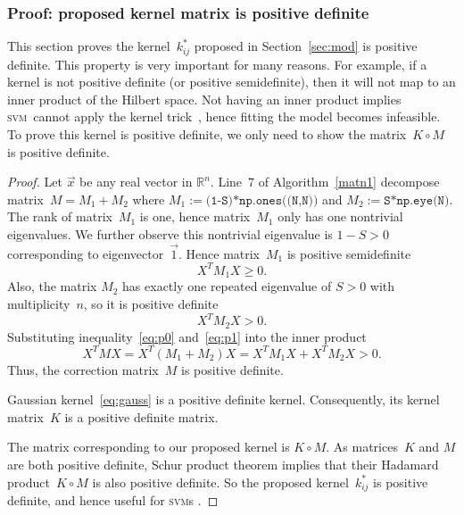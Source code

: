 \documentclass[12pt]{article} %
\newcommand{\svm}{\textsc{svm}}
\begin{document}
\subsubsection{Proof: proposed kernel matrix is positive definite} \label{sec:prove}
This section proves the kernel~$k^*_{ij}$ proposed in Section~\ref{sec:mod} is positive definite. This property is very important for many reasons. For example, if a kernel is not positive definite (or positive semidefinite), then it will not map to an inner product of the Hilbert space. Not having an inner product implies \svm\ cannot apply the kernel trick~\citep{Theodoridis:2008:PRF:1457541}, hence fitting the model becomes infeasible. To prove this kernel is positive definite, we only need to show the matrix~$K\circ M$ is positive definite.
\begin{proof}
Let $\vec x$ be any real vector in  $\mathbb{R}^n$. Line~$7$ of Algorithm~\ref{matn1} decompose matrix~$M=M_1+M_2$ where $M_1:=\texttt{(1-S)*np.ones((N,N))}$ and $M_2:=\texttt{S*np.eye(N)}$. The rank of  matrix~$M_1$ is one, hence matrix~$M_1$ only has one nontrivial eigenvalues. We further observe this nontrivial eigenvalue is $1-S>0$ corresponding to eigenvector~$\vec 1$. Hence matrix~$M_1$ is positive semidefinite
\begin{equation}\label{eq:p0}
    X^TM_1X\geq 0.
\end{equation}
Also, the matrix $M_2$ has exactly one repeated eigenvalue of $S>0$ with multiplicity~$n$, so it is positive definite
\begin{equation}\label{eq:p1}
    X^TM_2X>0.
\end{equation}
Substituting inequality~\eqref{eq:p0} and~\eqref{eq:p1} into the inner product
\begin{equation*}
    X^TMX=X^T(M_1+M_2)X=X^TM_1X+X^TM_2X>0.
\end{equation*}
Thus, the correction matrix~$M$ is positive definite.

Gaussian kernel~\eqref{eq:gauss} is a positive definite kernel. Consequently, its kernel matrix~$K$ is a positive definite matrix.

The matrix corresponding to our proposed kernel is $K\circ M$. As matrices~$K$ and $M$ are both positive definite, Schur product theorem \citep{Schur1911} implies that their Hadamard product~$K\circ M$ is also positive definite. So the proposed kernel~$k^*_{ij}$ is positive definite, and hence useful for \svm  s \citep{Theodoridis:2008:PRF:1457541}.
\end{proof}
\end{document}
